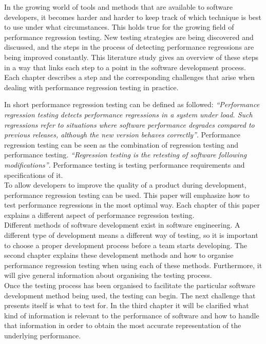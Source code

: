 In the growing world of tools and methods that are available to software developers, it becomes harder and harder to keep track of which technique is best to use under what circumstances. This holds true for the growing field of performance regression testing. New testing strategies are being discovered and discussed, and the steps in the process of detecting performance regressions are being improved constantly. This literature study gives an overview of these steps in a way that links each step to a point in the software development process. Each chapter describes a step and the corresponding challenges that arise when dealing with performance regression testing in practice.

In short performance regression testing can be defined as followed: \textit{``Performance regression testing detects performance
regressions in a system under load. Such regressions refer to
situations where software performance degrades compared to
previous releases, although the new version behaves correctly''}\cite{foo2010mining}.
Performance regression testing can be seen as the combination of regression testing and performance testing. \textit{``Regression testing is the retesting of software following modifications''}\cite{rothermel2001prioritizing}. Performance testing is testing performance requirements and specifications of it\cite{gan2006software}. \\

To allow developers to improve the quality of a product during development, performance regression testing can be used. This paper will emphasize how to test performance regressions in the most optimal way. Each chapter of this paper explains a different aspect of performance regression testing. \\ 

Different methods of software development exist in software engineering. A different type of development means a different way of testing, so it is important to choose a proper development process before a team starts developing. The second chapter explains these development methods and how to organise performance regression testing when using each of these methods. Furthermore, it will give general information about organising the testing process. \\

Once the testing process has been organised to facilitate the particular software development method being used, the testing can begin. The next challenge that presents itself is what to test for. In the third chapter it will be clarified what kind of information is relevant to the performance of software and how to handle that information in order to obtain the most accurate representation of the underlying performance. \\

